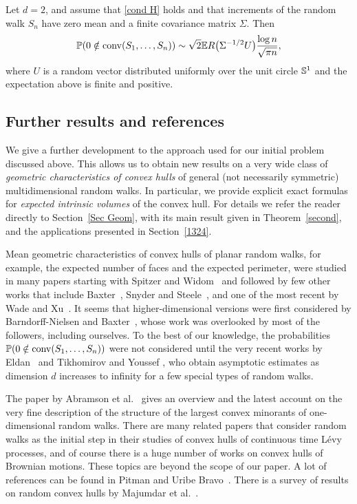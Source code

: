\documentclass[12pt, reqno]{amsart}
\begin{document}
\begin{theo}\label{theo: asympt}
Let $d=2$, and assume that \eqref{cond H} holds and that increments of the random walk $S_n$ have zero mean and a finite covariance matrix $\Sigma$. Then
$$
\P(0 \notin \conv(S_1,  \dots, S_n)) \sim \sqrt{2} \E R \bigl(\Sigma^{-1/2} U \bigr)  \frac{\log n}{\sqrt{\pi n}},
$$
where $U$ is a random vector distributed uniformly over the unit circle $\S^1$ and the expectation above is finite and positive.
\end{theo}

\subsection{Further results and references}
We give a further development to the approach used for our initial problem discussed above. This allows us to obtain new results on a very wide class of {\it geometric characteristics of convex hulls} of general (not necessarily symmetric) multidimensional random walks. In particular, we provide explicit exact formulas for {\it expected intrinsic volumes} of the convex hull. For details we refer the reader directly to Section~\ref{Sec Geom}, with its main result given in Theorem~\ref{second}, and the applications presented in Section~\ref{1324}.

Mean geometric characteristics of convex hulls of planar random walks, for example, the expected number of faces and the expected perimeter, were studied in many papers starting with Spitzer and Widom~\cite{SW} and followed by few other works that include Baxter~\cite{Baxter}, Snyder and Steele~\cite{SS}, and one of the most recent by Wade and Xu~\cite{WX}. It seems that higher-dimensional versions were first considered by Barndorff-Nielsen and Baxter~\cite{Nielsen}, whose work was overlooked by most of the followers, including ourselves. To the best of our knowledge, the probabilities $\P(0 \notin \conv(S_1, \dots, S_n))$ were not considered until the very recent works by Eldan~\cite{Eldan0} and Tikhomirov and Youssef \cite{TY14}, who obtain asymptotic estimates as dimension $d$ increases to infinity for a few special types of random walks.

The paper by Abramson et al.~\cite{Abram} gives an overview and the latest account on the very fine description of the structure of the largest convex minorants of one-dimensional random walks. There are many related papers that consider random walks as the initial step in their studies of convex hulls of continuous time L{\'e}vy processes, and of course there is a huge number of works on convex hulls of Brownian motions. These topics are beyond the scope of our paper. A lot of references can be found in Pitman and Uribe Bravo~\cite{PUB}. There is a survey of results on random convex hulls by Majumdar et al.~\cite{MCR10}.
\end{document}
